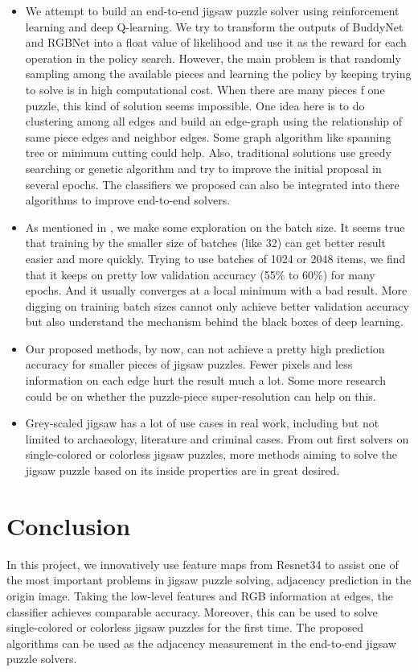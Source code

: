 \documentclass{article}
\begin{document}
\begin{itemize}
    \item We attempt to build an end-to-end jigsaw puzzle solver using reinforcement learning and deep Q-learning. We try to transform the outputs of BuddyNet and RGBNet into a float value of likelihood and use it as the reward for each operation in the policy search. However, the main problem is that randomly sampling among the available pieces and learning the policy by keeping trying to solve is in high computational cost. When there are many pieces f one puzzle, this kind of solution seems impossible. One idea here is to do clustering among all edges and build an edge-graph using the relationship of same piece edges and neighbor edges. Some graph algorithm like spanning tree or minimum cutting could help. Also, traditional solutions use greedy searching or genetic algorithm and try to improve the initial proposal in several epochs. The classifiers we proposed can also be integrated into there algorithms to improve end-to-end solvers.
    \item As mentioned in \cite{masters2018revisiting}, we make some exploration on the batch size. It seems true that training by the smaller size of batches (like 32) can get better result easier and more quickly. Trying to use batches of 1024 or 2048 items, we find that it keeps on pretty low validation accuracy (55\% to 60\%) for many epochs. And it usually converges at a local minimum with a bad result. More digging on training batch sizes cannot only achieve better validation accuracy but also understand the mechanism behind the black boxes of deep learning.
    \item Our proposed methods, by now, can not achieve a pretty high prediction accuracy for smaller pieces of jigsaw puzzles. Fewer pixels and less information on each edge hurt the result much a lot. Some more research could be on whether the puzzle-piece super-resolution can help on this.
    \item Grey-scaled jigsaw has a lot of use cases in real work, including but not limited to archaeology, literature and criminal cases. From out first solvers on single-colored or colorless jigsaw puzzles, more methods aiming to solve the jigsaw puzzle based on its inside properties are in great desired.
\end{itemize}

\section{Conclusion}

In this project, we innovatively use feature maps from Resnet34 to assist one of the most important problems in jigsaw puzzle solving, adjacency prediction in the origin image. Taking the low-level features and RGB information at edges, the classifier achieves comparable accuracy. Moreover, this can be used to solve single-colored or colorless jigsaw puzzles for the first time. The proposed algorithms can be used as the adjacency measurement in the end-to-end jigsaw puzzle solvers.



\end{document}

